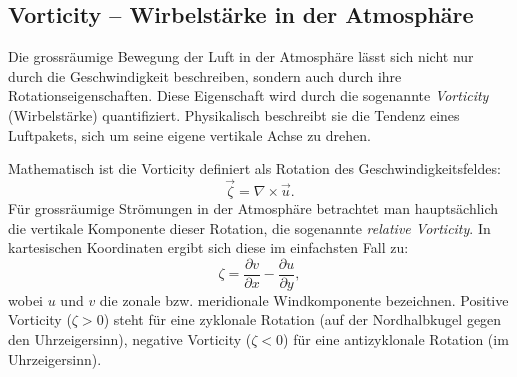 
\subsection{Vorticity – Wirbelstärke in der Atmosphäre}

Die grossräumige Bewegung der Luft in der Atmosphäre lässt sich nicht nur durch die
Geschwindigkeit beschreiben, sondern auch durch ihre Rotationseigenschaften.
Diese Eigenschaft wird durch die sogenannte \emph{Vorticity} (Wirbelstärke)
quantifiziert. Physikalisch beschreibt sie die Tendenz eines Luftpakets, sich
um seine eigene vertikale Achse zu drehen.

Mathematisch ist die Vorticity definiert als Rotation des
Geschwindigkeitsfeldes:
\begin{equation}
	\vec{\zeta} = \nabla \times \vec{u}.
	\label{rossby:eq:vorticity}
\end{equation}
Für grossräumige Strömungen in der Atmosphäre betrachtet man hauptsächlich die vertikale Komponente dieser Rotation, die sogenannte \emph{relative Vorticity}.
In kartesischen Koordinaten ergibt sich diese im einfachsten Fall zu:
\begin{equation}
	\zeta = \frac{\partial v}{\partial x} - \frac{\partial u}{\partial y},
	\label{rossby:eq:relative_vorticity}
\end{equation}
wobei \(u\) und \(v\) die zonale bzw. meridionale Windkomponente bezeichnen.
Positive Vorticity (\(\zeta > 0\)) steht für eine zyklonale Rotation (auf der Nordhalbkugel gegen den Uhrzeigersinn), negative Vorticity (\(\zeta < 0\)) für eine antizyklonale Rotation (im Uhrzeigersinn).
